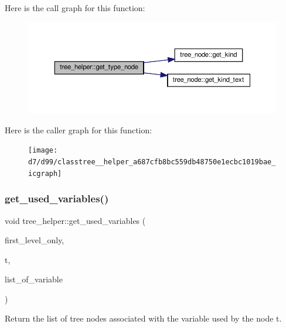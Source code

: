 Here is the call graph for this function\+:
\nopagebreak
\begin{figure}[H]
\begin{center}
\leavevmode
\includegraphics[width=350pt]{d7/d99/classtree__helper_a687cfb8bc559db48750e1ecbc1019bae_cgraph}
\end{center}
\end{figure}
Here is the caller graph for this function\+:
\nopagebreak
\begin{figure}[H]
\begin{center}
\leavevmode
\texttt{[image: d7/d99/classtree\_\_helper\_a687cfb8bc559db48750e1ecbc1019bae\_icgraph]}
\end{center}
\end{figure}
\mbox{\label{classtree__helper_a268bdfc7f6a52b970efc1715f557d55a}} 
\subsubsection{\texorpdfstring{get\+\_\+used\+\_\+variables()}{get\_used\_variables()}}
{\footnotesize\ttfamily void tree\+\_\+helper\+::get\+\_\+used\+\_\+variables (\begin{DoxyParamCaption}\item[{bool}]{first\+\_\+level\+\_\+only,  }\item[{const \hyperlink{tree__node_8hpp_a6ee377554d1c4871ad66a337eaa67fd5}{tree\+\_\+node\+Ref}}]{t,  }\item[{\hyperlink{classCustomUnorderedSet}{Custom\+Unordered\+Set}$<$ unsigned int $>$ \&}]{list\+\_\+of\+\_\+variable }\end{DoxyParamCaption})\hspace{0.3cm}{\ttfamily [static]}}



Return the list of tree nodes associated with the variable used by the node t. 


